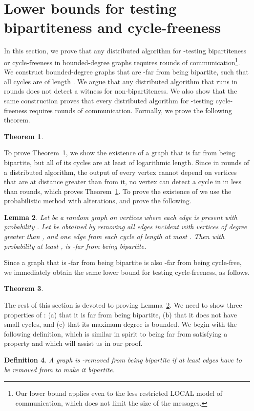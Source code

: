 \documentclass[11pt]{article}
\newtheorem{theorem}{Theorem}[section]
\newtheorem{lemma}[theorem]{Lemma}
\newtheorem{definition}[theorem]{Definition}
\begin{document}
\section{Lower bounds for testing bipartiteness and cycle-freeness}
\label{sec:lowerbounds}
In this section, we prove that any distributed algorithm for -testing bipartiteness or cycle-freeness in
bounded-degree graphs requires  rounds of communication\footnote{Our lower bound applies even to the less restricted LOCAL model of communication, which does not limit the size of the messages.}. We
construct bounded-degree graphs that are -far from being bipartite, such that all cycles
are of length .  We argue that any distributed algorithm that runs in  rounds does not detect a witness for non-bipartiteness. We also show that the same
construction proves that every distributed algorithm for -testing cycle-freeness
requires  rounds of communication.
Formally, we prove the following theorem.
\begin{theorem}
\ThmLBBi
  \label{thm:bipart-lower-bound}
\end{theorem}

To prove Theorem~\ref{thm:bipart-lower-bound}, we show the existence of a graph  that is far from being bipartite, but all of its cycles are at least of logarithmic length. Since in  rounds of a distributed algorithm, the output of every vertex cannot depend on vertices that are at distance greater than  from it, no vertex can detect a cycle in  in less than  rounds, which proves Theorem~\ref{thm:bipart-lower-bound}. To prove the existence of  we use the probabilistic method with alterations, and prove the following.
\begin{lemma}
  Let  be a random graph on  vertices where each edge is present with probability .
  Let  be obtained by removing all edges incident with vertices of degree greater than , and
  one edge from each cycle of length at most . Then with probability at least
  ,  is -far from being bipartite.
  \label{lem:graph-far}
\end{lemma}

Since a graph that is -far from being bipartite is also -far from being cycle-free, we immediately obtain the same lower bound for testing cycle-freeness, as follows.

\begin{theorem}
\ThmLBCycle
  \label{cor:cycle-lower-bound}
\end{theorem}


The rest of this section is devoted to proving Lemma~\ref{lem:graph-far}. We need to show three properties of : (a) that it is far from being bipartite, (b) that it does not have small cycles, and (c) that its maximum degree is bounded. We begin with the following definition, which is similar in spirit to being far from satisfying a property and which will assist us in our proof.
\begin{definition}
 A graph  is -removed from being bipartite if at least  edges have to be removed from  to
 make it bipartite.
 \label{def:k-removed}
\end{definition}
\end{document}
